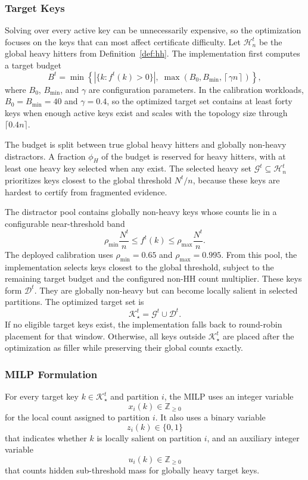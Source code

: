 \documentclass[sigconf, nonacm]{acmart}
\begin{document}
\subsubsection{Target Keys}

Solving over every active key can be unnecessarily expensive, so the optimization focuses on the keys that can most affect certificate difficulty. Let \(\mathcal H_n^t\) be the global heavy hitters from Definition~\ref{def:hh}. The implementation first computes a target budget
\[
B^t
=
\min\!\left\{
|\{k:f^t(k)>0\}|,\;
\max\!\left(B_0,B_{\min},\left\lceil \gamma n\right\rceil\right)
\right\},
\]
where \(B_0\), \(B_{\min}\), and \(\gamma\) are configuration parameters. In the calibration workloads, \(B_0=B_{\min}=40\) and \(\gamma=0.4\), so the optimized target set contains at least forty keys when enough active keys exist and scales with the topology size through \(\lceil 0.4n\rceil\).

The budget is split between true global heavy hitters and globally non-heavy distractors. A fraction \(\phi_H\) of the budget is reserved for heavy hitters, with at least one heavy key selected when any exist. The selected heavy set \(\mathcal G^t\subseteq\mathcal H_n^t\) prioritizes keys closest to the global threshold \(N^t/n\), because these keys are hardest to certify from fragmented evidence.

The distractor pool contains globally non-heavy keys whose counts lie in a configurable near-threshold band
\[
\rho_{\min}\frac{N^t}{n}
\le
f^t(k)
\le
\rho_{\max}\frac{N^t}{n}.
\]
The deployed calibration uses \(\rho_{\min}=0.65\) and \(\rho_{\max}=0.995\). From this pool, the implementation selects keys closest to the global threshold, subject to the remaining target budget and the configured non-HH count multiplier. These keys form \(\mathcal D^t\). They are globally non-heavy but can become locally salient in selected partitions. The optimized target set is
\[
\mathcal K_\star^t=\mathcal G^t\cup \mathcal D^t.
\]
If no eligible target keys exist, the implementation falls back to round-robin placement for that window. Otherwise, all keys outside \(\mathcal K_\star^t\) are placed after the optimization as filler while preserving their global counts exactly.

\subsubsection{MILP Formulation}

For every target key \(k\in\mathcal K_\star^t\) and partition \(i\), the MILP uses an integer variable
\[
x_i(k)\in\mathbb Z_{\ge 0}
\]
for the local count assigned to partition \(i\). It also uses a binary variable
\[
z_i(k)\in\{0,1\}
\]
that indicates whether \(k\) is locally salient on partition \(i\), and an auxiliary integer variable
\[
u_i(k)\in\mathbb Z_{\ge 0}
\]
that counts hidden sub-threshold mass for globally heavy target keys.
\end{document}
